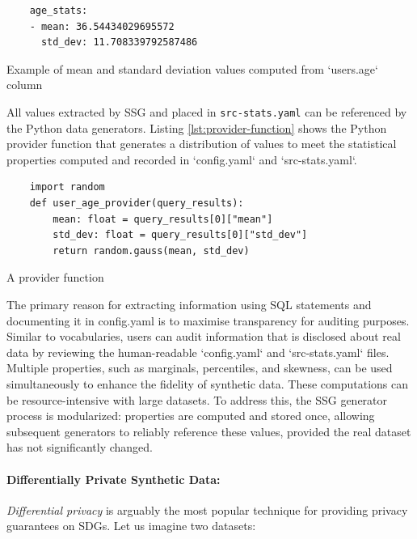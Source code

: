 \documentclass[11pt]{article}
\begin{document}
\begin{listing}[H]
\begin{verbatim}
    age_stats:
    - mean: 36.54434029695572
      std_dev: 11.708339792587486
\end{verbatim}
\caption{Example of mean and standard deviation values computed from `users.age` column}
\label{lst:age_stats src-stats.yaml}
\end{listing}

All values extracted by SSG and placed in \texttt{src-stats.yaml} can be referenced by the Python data generators. Listing \ref{lst:provider-function} shows the Python provider function that generates a distribution of values to meet the statistical properties computed and recorded in `config.yaml` and `src-stats.yaml`.

\begin{listing}[H]
\begin{verbatim}
    import random
    def user_age_provider(query_results):
        mean: float = query_results[0]["mean"]
        std_dev: float = query_results[0]["std_dev"]
        return random.gauss(mean, std_dev)
\end{verbatim} 
\caption{A provider function }
\label{lst:provider-function}
\end{listing}

The primary reason for extracting information using SQL statements and documenting it in config.yaml is to maximise transparency for auditing purposes. Similar to vocabularies, users can audit information that is disclosed about real data by reviewing the human-readable `config.yaml` and `src-stats.yaml` files. Multiple properties, such as marginals, percentiles, and skewness, can be used simultaneously to enhance the fidelity of synthetic data. These computations can be resource-intensive with large datasets. To address this, the SSG generator process is modularized: properties are computed and stored once, allowing subsequent generators to reliably reference these values, provided the real dataset has not significantly changed.

\paragraph{Differentially Private Synthetic Data:}

\emph{Differential privacy} is arguably the most popular technique for providing privacy guarantees on SDGs.
Let us imagine two datasets:
\end{document}
